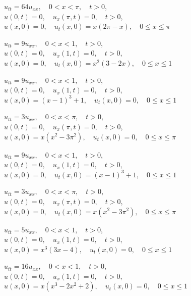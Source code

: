 \begin{exerciselist}
  \item\label{exer:12.2.37} $u_{tt}=64u_{xx},\quad0<x<\pi,\quad t>0$,\\ $u(0,t)=0,\quad u_{x}(\pi,t)=0,\quad t>0$,\\ $u(x,0)=0,\quad u_{t}(x,0)=x(2\pi-x),\quad0\le x\le\pi$

  \item\label{exer:12.2.38} \Cex $u_{tt}=9u_{xx},\quad0<x<1,\quad t>0$,\\ $u(0,t)=0,\quad u_{x}(1,t)=0,\quad t>0$,\\ $u(x,0)=0,\quad u_{t}(x,0)=x^{2}(3-2x),\quad0\le x\le1$

  \item\label{exer:12.2.39} $u_{tt}=9u_{xx},\quad0<x<1,\quad t>0$,\\ $u(0,t)=0,\quad u_{x}(1,t)=0,\quad t>0$,\\ $u(x,0)=(x-1)^{3}+1,\quad u_{t}(x,0)=0,\quad0\le x\le1$

  \item\label{exer:12.2.40} $u_{tt}=3u_{xx},\quad0<x<\pi,\quad t>0$,\\ $u(0,t)=0,\quad u_{x}(\pi,t)=0,\quad t>0$,\\ $u(x,0)=x(x^{2}-3\pi^{2}),\quad u_{t}(x,0)=0,\quad0\le x\le\pi$

  \item\label{exer:12.2.41} $u_{tt}=9u_{xx},\quad0<x<1,\quad t>0$,\\ $u(0,t)=0,\quad u_{x}(1,t)=0,\quad t>0$,\\ $u(x,0)=0,\quad u_{t}(x,0)=(x-1)^{3}+1,\quad0\le x\le1$

  \item\label{exer:12.2.42} $u_{tt}=3u_{xx},\quad0<x<\pi,\quad t>0$,\\ $u(0,t)=0,\quad u_{x}(\pi,t)=0,\quad t>0$,\\ $u(x,0)=0,\quad u_{t}(x,0)=x(x^{2}-3\pi^{2}),\quad0\le x\le\pi$

  \item\label{exer:12.2.43} $u_{tt}=5u_{xx},\quad0<x<1,\quad t>0$,\\ $u(0,t)=0,\quad u_{x}(1,t)=0,\quad t>0$,\\ $u(x,0)=x^{3}(3x-4),\quad u_{t}(x,0)=0,\quad0\le x\le1$

  \item\label{exer:12.2.44} \Cex $u_{tt}=16u_{xx},\quad0<x<1,\quad t>0$,\\ $u(0,t)=0,\quad u_{x}(1,t)=0,\quad t>0$,\\ $u(x,0)=x(x^{3}-2x^{2}+2),\quad u_{t}(x,0)=0,\quad0\le x\le1$


\end{exerciselist}

